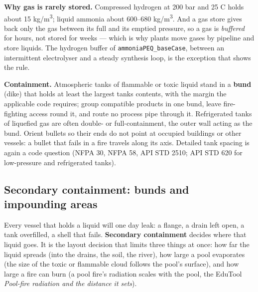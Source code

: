 \documentclass[11pt,a4paper]{article}
\begin{document}
\textbf{Why gas is rarely stored.} Compressed hydrogen at 200 bar and
25 \textdegree{}C holds about 15 kg/m\textsuperscript{3}; liquid ammonia
about 600--680 kg/m\textsuperscript{3}. And a gas store gives back only
the gas between its full and its emptied pressure, so a gas is
\emph{buffered} for hours, not stored for weeks --- which is why plants
move gases by pipeline and store liquids. The hydrogen buffer of
\texttt{ammoniaPEQ\_baseCase}, between an intermittent electrolyser
and a steady synthesis loop, is the exception that shows the rule.

\textbf{Containment.} Atmospheric tanks of flammable or toxic liquid
stand in a \textbf{bund} (dike) that holds at least the largest
tank\textquotesingle s contents, with the margin the applicable code
requires; group compatible products in one bund, leave fire-fighting
access round it, and route no process pipe through it. Refrigerated
tanks of liquefied gas are often double- or full-containment, the outer
wall acting as the bund. Orient bullets so their ends do not point at
occupied buildings or other vessels: a bullet that fails in a fire
travels along its axis. Detailed tank spacing is again a code question
(NFPA 30, NFPA 58, API STD 2510; API STD 620 for low-pressure and
refrigerated tanks).

\hypertarget{secondary-containment-bunds-and-impounding}{%
\subsection{Secondary containment: bunds and impounding
areas}\label{secondary-containment-bunds-and-impounding}}

Every vessel that holds a liquid will one day leak: a flange, a drain
left open, a tank overfilled, a shell that fails. \textbf{Secondary
containment} decides where that liquid goes. It is the layout
decision that limits three things at once: how far the liquid
spreads (into the drains, the soil, the river), how large a pool
evaporates (the size of the toxic or flammable cloud follows the
pool's surface), and how large a fire can burn (a pool fire's
radiation scales with the pool, the EduTool \emph{Pool-fire
radiation and the distance it sets}).
\end{document}
